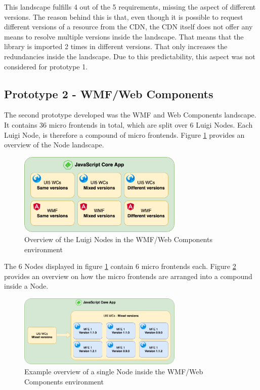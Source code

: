 This landscape fulfills 4 out of the 5 requirements, missing the aspect of different versions. The reason behind this is that, even though it is possible to request different versions of a resource from the CDN, the CDN itself does not offer any means to resolve multiple versions inside the landscape. That means that the library is imported 2 times in different versions. That only increases the redundancies inside the landscape. Due to this predictability, this aspect was not considered for prototype 1.

\subsection{Prototype 2 - WMF/Web Components}

The second prototype developed was the WMF and Web Components landscape. It contains 36 micro frontends in total, which are split over 6 Luigi Nodes.
Each Luigi Node, is therefore a compound of micro frontends.
Figure \ref{fig:compound_prototype_architecture} provides an overview of the Node landscape.

\begin{figure}[!h]
	\centering
	\includegraphics[width=0.7\textwidth]{Figures/compound_views_overview.drawio.png}
	\caption{Overview of the Luigi Nodes in the WMF/Web Components environment}
	\label{fig:compound_prototype_architecture}
\end{figure}

The 6 Nodes displayed in figure \ref{fig:compound_prototype_architecture} contain 6 micro frontends each. 
Figure \ref{fig:compound_wmf_single_node} provides an overview on how the micro frontends are arranged into a compound inside a Node.

\begin{figure}[!h]
	\centering
	\includegraphics[width=0.7\textwidth]{Figures/compound_wmf_single_node.drawio.png}
	\caption{Example overview of a single Node inside the WMF/Web Components environment}
	\label{fig:compound_wmf_single_node}
\end{figure}

